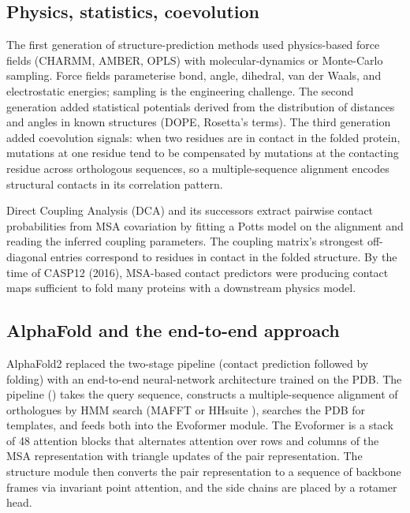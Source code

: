 \subsection{Physics, statistics, coevolution}

The first generation of structure-prediction methods used physics-based
force fields (CHARMM, AMBER, OPLS) with molecular-dynamics or
Monte-Carlo sampling. Force fields parameterise bond, angle, dihedral,
van der Waals, and electrostatic energies; sampling is the engineering
challenge. The second generation added statistical potentials derived
from the distribution of distances and angles in known structures
(DOPE, Rosetta's terms). The third generation added coevolution
signals: when two residues are in contact in the folded protein,
mutations at one residue tend to be compensated by mutations at the
contacting residue across orthologous sequences, so a multiple-sequence
alignment encodes structural contacts in its correlation pattern.

Direct Coupling Analysis (DCA) and its successors extract pairwise
contact probabilities from MSA covariation by fitting a Potts model on
the alignment and reading the inferred coupling parameters. The
coupling matrix's strongest off-diagonal entries correspond to
residues in contact in the folded structure. By the time of CASP12
(2016), MSA-based contact predictors were producing contact maps
sufficient to fold many proteins with a downstream physics model.

\subsection{AlphaFold and the end-to-end approach}

AlphaFold2 \cite{paper:v6c11-jumper-alphafold-2021} replaced the
two-stage pipeline (contact prediction followed by folding) with an
end-to-end neural-network architecture trained on the PDB. The pipeline
() takes the query sequence,
constructs a multiple-sequence alignment of orthologues by HMM search
(MAFFT or HHsuite \cite{paper:v6c11-katoh-mafft-2013}), searches the
PDB for templates, and feeds both into the Evoformer module. The
Evoformer is a stack of 48 attention blocks that alternates attention
over rows and columns of the MSA representation with triangle updates
of the pair representation. The structure module then converts the
pair representation to a sequence of backbone frames via invariant
point attention, and the side chains are placed by a rotamer head.

